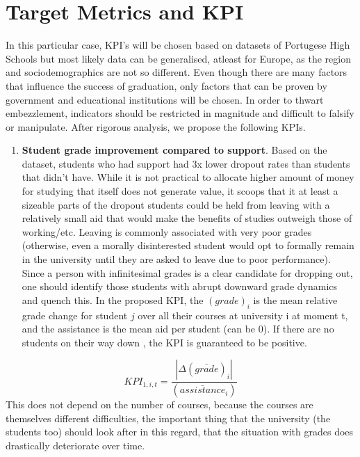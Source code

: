 \documentclass[
  letterpaper,
  DIV=11,
  numbers=noendperiod]{scrartcl}
\providecommand{\tightlist}{%
  \setlength{\itemsep}{0pt}\setlength{\parskip}{0pt}}\usepackage{longtable,booktabs,array}
\begin{document}
\hypertarget{sec-kpi}{%
\section{Target Metrics and KPI}\label{sec-kpi}}

In this particular case, KPI's will be chosen based on datasets of
Portugese High Schools but most likely data can be generalised, atleast
for Europe, as the region and sociodemographics are not so different.
Even though there are many factors that influence the success of
graduation, only factors that can be proven by government and
educational institutions will be chosen. In order to thwart
embezzlement, indicators should be restricted in magnitude and difficult
to falsify or manipulate. After rigorous analysis, we propose the
following KPIs.

\begin{enumerate}
\def\labelenumi{\alph{enumi}.}
\tightlist
\item
  \textbf{Student grade improvement compared to support}. Based on the
  dataset, students who had support had 3x lower dropout rates than
  students that didn't have. While it is not practical to allocate
  higher amount of money for studying that itself does not generate
  value, it scoops that it at least a sizeable parts of the dropout
  students could be held from leaving with a relatively small aid that
  would make the benefits of studies outweigh those of working/etc.
  Leaving is commonly associated with very poor grades (otherwise, even
  a morally disinterested student would opt to formally remain in the
  university until they are asked to leave due to poor performance).
  Since a person with infinitesimal grades is a clear candidate for
  dropping out, one should identify those students with abrupt downward
  grade dynamics and quench this. In the proposed KPI, the
  \((grade)_{i}\) is the mean relative grade change for student \(j\)
  over all their courses at university i at moment t, and the assistance
  is the mean aid per student (can be 0). If there are no students on
  their way down , the KPI is guaranteed to be positive.
\end{enumerate}

\[KPI_{1, i,t} =  \frac{|\Delta(\bar{grade})_i|}{ (\bar{assistance}_i)}\]
This does not depend on the number of courses, because the courses are
themselves different difficulties, the important thing that the
university (the students too) should look after in this regard, that the
situation with grades does drastically deteriorate over time.
\end{document}
